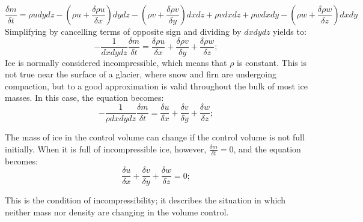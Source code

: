 \documentclass{article}
\begin{document}
\begin{equation}
	\frac{\delta m}{\delta t}=\rho u dydz-({\rho u+\frac{\delta \rho u}{\delta x}})dydz-({\rho v+\frac{\delta \rho v}{\delta y}})dxdz+\rho vdxdz+\rho wdxdy-({\rho w+\frac{\delta \rho w}{\delta z}})dxdy
\end{equation}
Simplifying by cancelling terms of opposite sign and dividing by $dxdydz$ yields to:
\begin{equation}
	-\frac{1}{dxdydz}\frac{\delta m}{\delta t}=\frac{\delta \rho u}{\delta x}+\frac{\delta \rho v}{\delta y}+\frac{\delta \rho w}{\delta z};
\end{equation}
Ice is normally considered incompressible, which means that $\rho$ is constant. This is not true near the surface of a glacier, where snow and firn are undergoing compaction, but to a good approximation is valid throughout the bulk of most ice masses. In this case, the equation becomes:
\begin{equation}
	-\frac{1}{\rho dxdydz}\frac{\delta m}{\delta t}=\frac{\delta u}{\delta x}+\frac{\delta v}{\delta y}+\frac{\delta w}{\delta z};
\end{equation}

The mass of ice in the control volume can change if the control volume is not full initially. When it is full of incompressible ice, however, $\frac{\delta m}{\delta t}=0$, and the equation becomes:
\begin{equation}
	\frac{\delta u}{\delta x}+\frac{\delta v}{\delta y}+\frac{\delta w}{\delta z}=0;
\end{equation}

This is the condition of incompressibility; it describes the situation in which neither mass nor density are changing in the volume control.
\end{document}
